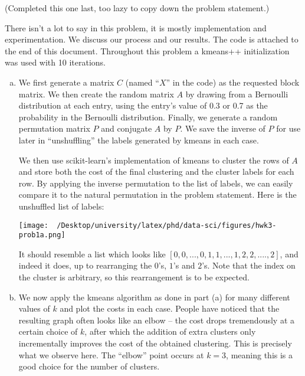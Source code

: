 \begin{homework}[e]
   (Completed this one last, too lazy to copy down the problem statement.)
  \begin{soln}
    There isn't a lot to say in this problem, it is mostly implementation and experimentation. We discuss our process and our results. The code is attached to the end of this document. Throughout this problem a kmeans++ initialization was used with 10 iterations.
    \begin{enumerate}[(a)]
      \item We first generate a matrix $C$ (named ``$X$'' in the code) as the requested block matrix. We then create the random matrix $A$ by drawing from a Bernoulli distribution at each entry, using the entry's value of 0.3 or 0.7 as the probability in the Bernoulli distribution. Finally, we generate a random permutation matrix $P$ and conjugate $A$ by $P$. We save the inverse of $P$ for use later in ``unshuffling'' the labels generated by kmeans in each case.

        We then use scikit-learn's implementation of kmeans to cluster the rows of $A$ and store both the cost of the final clustering and the cluster labels for each row. By applying the inverse permutation to the list of labels, we can easily compare it to the natural permutation in the problem statement. Here is the unshuffled list of labels:

        \begin{center}
          \texttt{[image: ~/Desktop/university/latex/phd/data-sci/figures/hwk3-prob1a.png]}
          \label{fig:prob1a}
        \end{center}
        It should resemble a list which looks like $[0,0,...,0,1,1,...,1,2,2,....,2]$, and indeed it does, up to rearranging the $0$'s, $1$'s and $2$'s. Note that the index on the cluster is arbitrary, so this rearrangement is to be expected.
        \item We now apply the kmeans algorithm as done in part (a) for many different values of $k$ and plot the costs in each case. People have noticed that the resulting graph often looks like an elbow -- the cost drops tremendously at a certain choice of $k$, after which the addition of extra clusters only incrementally improves the cost of the obtained clustering. This is precisely what we observe here. The ``elbow'' point occurs at $k = 3$, meaning this is a good choice for the number of clusters.


\end{enumerate}
\end{soln}
\end{homework}
